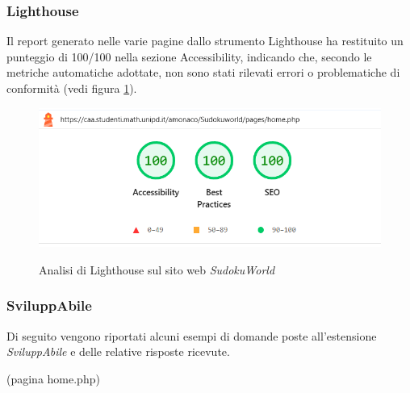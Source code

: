 \subsubsection{Lighthouse}
\noindent Il report generato nelle varie pagine dallo strumento Lighthouse ha restituito un punteggio di 100/100 nella sezione Accessibility, indicando che, secondo le metriche automatiche adottate, non sono stati rilevati errori o problematiche di conformità (vedi figura \ref{fig:Lighthouse_sudoku}).
\begin{figure}[H]
    \centering
    \includegraphics[width=0.6\linewidth, alt={Screenshot dell'analisi di Lighthouse sul sito web SudokuWorld}]{img/Lighthouse_sudoku.png}
    \caption{Analisi di Lighthouse sul sito web \textit{SudokuWorld}}\label{fig:Lighthouse_sudoku}
\end{figure}

\subsubsection{SviluppAbile}
\noindent Di seguito vengono riportati alcuni esempi di domande poste all’estensione \textit{SviluppAbile} e delle relative risposte ricevute. 

\vspace{0.5cm}
\noindent(pagina home.php)
\vspace{-0.5cm}
